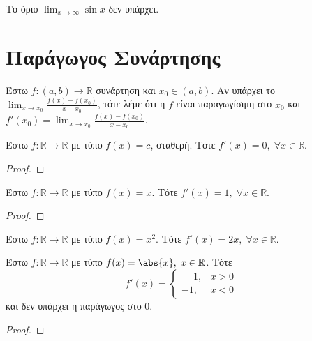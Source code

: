 \documentclass[main.tex]{subfiles}
\begin{document}
\begin{prop}
    Το όριο $ \lim_{x \to \infty} \sin{x} $ δεν υπάρχει.
\end{prop}

\section{Παράγωγος Συνάρτησης}

\begin{dfn}
    Έστω $ f \colon (a,b) \to \mathbb{R} $ συνάρτηση και $ x_{0} \in (a,b) $. Αν 
    υπάρχει το $ \lim_{x \to x_{0}} \frac{f(x) - f(x_{0})}{x - x_{0}}$, τότε λέμε ότι 
    η $f$ είναι παραγωγίσιμη στο $ x_{0} $ και $ f'(x_{0}) = \lim_{x \to x_{0}} 
    \frac{f(x)-f(x_{0})}{x- x_{0}} $.
\end{dfn}

\begin{prop}
    Έστω $ f \colon \mathbb{R} \to \mathbb{R} $ με τύπο $ f(x)=c $, σταθερή. Τότε 
    $ f'(x) = 0, \; \forall x \in \mathbb{R} $. 
\end{prop}

\begin{proof}
    
\end{proof}

\begin{prop}
    Έστω $ f \colon \mathbb{R} \to \mathbb{R} $ με τύπο $ f(x)=x $. Τότε 
    $ f'(x) = 1, \; \forall x \in \mathbb{R} $. 
\end{prop}

\begin{proof}
    
\end{proof}

\begin{prop}
    Έστω $ f \colon \mathbb{R} \to \mathbb{R} $ με τύπο $ f(x)=x^{2} $. Τότε 
    $ f'(x) = 2x, \; \forall x \in \mathbb{R} $. 
\end{prop}

\begin{prop}
    Έστω $ f \colon \mathbb{R} \to \mathbb{R} $ με τύπο $ f(x) = \abs{x}, \; 
    x \in \mathbb{R}$. Τότε 
    \[
        f'(x) = \begin{cases} \phantom{-}1, & x>0 \\ -1, & x<0 \end{cases} 
    \] 
    και δεν υπάρχει η παράγωγος στο $0$.
\end{prop}

\begin{proof}
    
\end{proof}
\end{document}
